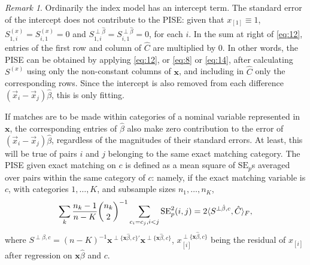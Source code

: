\documentclass{article}
\theoremstyle{remark}
\newtheorem*{remark}{Remark}
\begin{document}
\begin{remark}
Ordinarily the index model has an intercept term. The standard error of the intercept does not contribute to the PISE: given that $x_{[1]} \equiv 1$,  $S^{(x)}_{1,i}= S^{(x)}_{i,1}=0$ and $S^{\perp \hat\beta}_{1,i}=S^{\perp \hat\beta}_{i,1}=0$, for each $i$. In the sum at right of \eqref{eq:12}, entries of the first row and column of $\hat{C}$ are multiplied by 0. In other words, the PISE can be obtained by applying \eqref{eq:12}, or \eqref{eq:8} or \eqref{eq:14}, after calculating $S^{(x)}$ using only the non-constant columns of $\mathbf{x}$, and including in $\hat C$ only the corresponding rows. Since the intercept is also removed from each difference $(\vec{x}_{i} - \vec{x}_{j})\hat{\beta}$, this is only fitting. 

If matches are to be made within categories of a nominal variable represented in $\mathbf{x}$, the corresponding entries of $\hat\beta$ also make zero contribution to the error of  $(\vec{x}_{i} - \vec{x}_{j})\hat{\beta}$, regardless of the magnitudes of their standard errors.  At least, this will be true of pairs $i$ and $j$ belonging to the same exact matching category.  The PISE given exact matching on $c$ is defined as a mean square of $ \mathrm{SE}_{p}$s averaged over pairs within the same category of $c$: namely, if the exact matching variable is $c$, with categories $1, \ldots, K$,  and subsample sizes $n_{1}, \ldots, n_{K}$, 
\begin{equation*}
  \sum_{k} \frac{n_{k} -1}{n-K} {n_{k} \choose 2}^{-1} \sum_{c_{i}=c_{j}, i<j}  \mathrm{SE}_{p}^{2}(i, j)= 2 \langle S^{\perp \hat\beta, c}, \hat{C}\rangle_{F},
\end{equation*}
where $S^{\perp \hat\beta, c} = (n-K)^{-1} \mathbf{x}^{\perp\{\mathbf{x}\hat\beta, c\}\prime}\mathbf{x}^{\perp\{\mathbf{x}\hat\beta, c\}}$, $x_{[i]}^{\perp\{\mathbf{x}\hat\beta, c\}}$ being the residual of $x_{[i]} $ after regression on $\mathbf{x}\hat\beta$ and $c$.
\end{remark}
\end{document}
